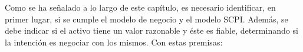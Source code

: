 
Como se ha señalado a lo largo de este capítulo, es necesario identificar, en primer lugar, si se cumple el modelo de negocio y el modelo SCPI. Además, se debe indicar si el activo tiene un valor razonable y éste es fiable, determinando si la intención es negociar con los mismos. Con estas premisas:

